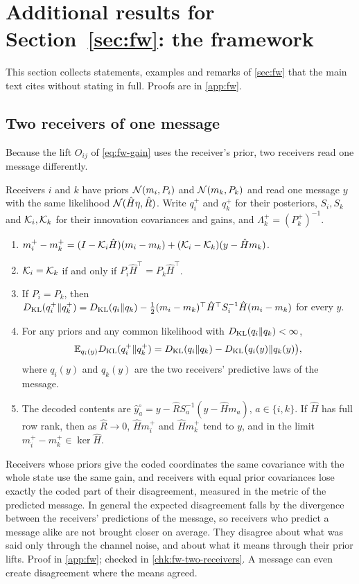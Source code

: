 \section{Additional results for \texorpdfstring{Section~\ref{sec:fw}}{Section 2}: the framework}\label{sup:fw}

This section collects statements, examples and remarks of \cref{sec:fw} that the main text cites without stating in full. Proofs are in \cref{app:fw}.

\subsection{Two receivers of one message}\label{sup:fw-two-receivers-of-one-message}

Because the lift $O_{ij}$ of \eqref{eq:fw-gain} uses the receiver's prior, two receivers read one message differently.

\begin{proposition}\label{prop:fw-two-receivers}
Receivers $i$ and $k$ have priors $\mathcal{N}(m_i,P_i)$ and $\mathcal{N}(m_k,P_k)$ and read one message $y$ with the same likelihood $\mathcal{N}(\hat H\eta,\hat R)$. Write $q_i^+$ and $q_k^+$ for their posteriors, $S_i,S_k$ and $\mathcal{K}_i,\mathcal{K}_k$ for their innovation covariances and gains, and $\Lambda_k^+=(P_k^+)^{-1}$.
\begin{enumerate}
\item[(a)] $m_i^+-m_k^+=(I-\mathcal{K}_i\hat H)(m_i-m_k)+(\mathcal{K}_i-\mathcal{K}_k)(y-\hat Hm_k)$.
\item[(b)] $\mathcal{K}_i=\mathcal{K}_k$ if and only if $P_i\hat H^\top=P_k\hat H^\top$.
\item[(c)] If $P_i=P_k$, then $D_{\mathrm{KL}}(q_i^+\Vert q_k^+)=D_{\mathrm{KL}}(q_i\Vert q_k)-\tfrac12(m_i-m_k)^\top\hat H^\top S_i^{-1}\hat H(m_i-m_k)$ for every $y$.
\item[(d)] For any priors and any common likelihood with $D_{\mathrm{KL}}(q_i\Vert q_k)<\infty$,
\[
\mathbb{E}_{q_i(y)}D_{\mathrm{KL}}(q_i^+\Vert q_k^+)=D_{\mathrm{KL}}(q_i\Vert q_k)-D_{\mathrm{KL}}\bigl(q_i(y)\Vert q_k(y)\bigr),
\]
where $q_i(y)$ and $q_k(y)$ are the two receivers' predictive laws of the message.
\item[(e)] The decoded contents are $\hat y^\circ_a=y-\hat RS_a^{-1}(y-\hat Hm_a)$, $a\in\{i,k\}$. If $\hat H$ has full row rank, then as $\hat R\to0$, $\hat Hm_i^+$ and $\hat Hm_k^+$ tend to $y$, and in the limit $m_i^+-m_k^+\in\ker\hat H$.
\end{enumerate}
\end{proposition}

Receivers whose priors give the coded coordinates the same covariance with the whole state use the same gain, and receivers with equal prior covariances lose exactly the coded part of their disagreement, measured in the metric of the predicted message. In general the expected disagreement falls by the divergence between the receivers' predictions of the message, so receivers who predict a message alike are not brought closer on average. They disagree about what was said only through the channel noise, and about what it means through their prior lifts. Proof in \cref{app:fw}; checked in \cref{chk:fw-two-receivers}. A message can even create disagreement where the means agreed.

